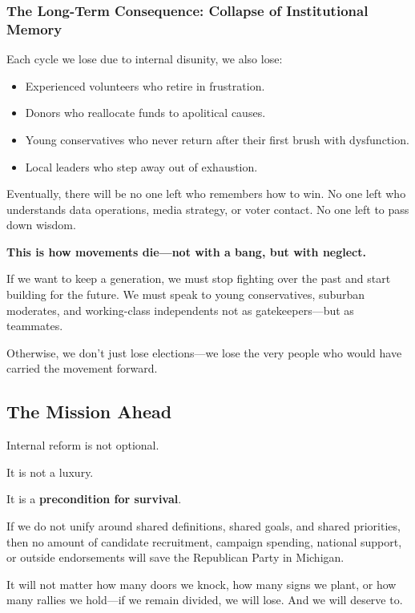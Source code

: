 \subsubsection{The Long-Term Consequence: Collapse of Institutional Memory}
Each cycle we lose due to internal disunity, we also lose:
\begin{itemize}
\item Experienced volunteers who retire in frustration.
\item Donors who reallocate funds to apolitical causes.
\item Young conservatives who never return after their first brush with dysfunction.
\item Local leaders who step away out of exhaustion.
\end{itemize}

Eventually, there will be no one left who remembers how to win. No one left who understands data operations, media strategy, or voter contact. No one left to pass down wisdom.

\textbf{This is how movements die—not with a bang, but with neglect.}

If we want to keep a generation, we must stop fighting over the past and start building for the future. We must speak to young conservatives, suburban moderates, and working-class independents not as gatekeepers—but as teammates.

Otherwise, we don’t just lose elections—we lose the very people who would have carried the movement forward.



\subsection{The Mission Ahead}

Internal reform is not optional.

It is not a luxury.

It is a \textbf{precondition for survival}.

If we do not unify around shared definitions, shared goals, and shared priorities, then no amount of candidate recruitment, campaign spending, national support, or outside endorsements will save the Republican Party in Michigan.

It will not matter how many doors we knock, how many signs we plant, or how many rallies we hold—if we remain divided, we will lose. And we will deserve to.

